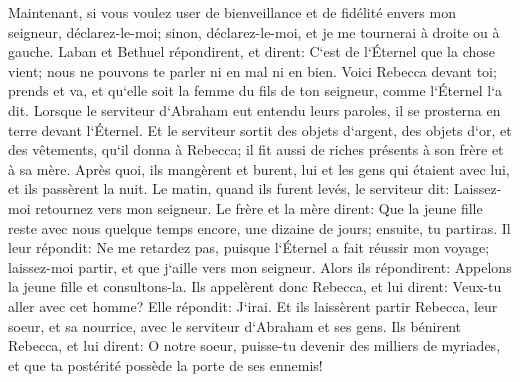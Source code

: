 \verse Maintenant, si vous voulez user de bienveillance et de fidélité envers mon seigneur, déclarez-le-moi; sinon, déclarez-le-moi, et je me tournerai à droite ou à gauche. 
\verse Laban et Bethuel répondirent, et dirent: C`est de l`Éternel que la chose vient; nous ne pouvons te parler ni en mal ni en bien. 
\verse Voici Rebecca devant toi; prends et va, et qu`elle soit la femme du fils de ton seigneur, comme l`Éternel l`a dit. 
\verse Lorsque le serviteur d`Abraham eut entendu leurs paroles, il se prosterna en terre devant l`Éternel. 
\verse Et le serviteur sortit des objets d`argent, des objets d`or, et des vêtements, qu`il donna à Rebecca; il fit aussi de riches présents à son frère et à sa mère. 
\verse Après quoi, ils mangèrent et burent, lui et les gens qui étaient avec lui, et ils passèrent la nuit. Le matin, quand ils furent levés, le serviteur dit: Laissez-moi retournez vers mon seigneur. 
\verse Le frère et la mère dirent: Que la jeune fille reste avec nous quelque temps encore, une dizaine de jours; ensuite, tu partiras. 
\verse Il leur répondit: Ne me retardez pas, puisque l`Éternel a fait réussir mon voyage; laissez-moi partir, et que j`aille vers mon seigneur. 
\verse Alors ils répondirent: Appelons la jeune fille et consultons-la. 
\verse Ils appelèrent donc Rebecca, et lui dirent: Veux-tu aller avec cet homme? Elle répondit: J`irai. 
\verse Et ils laissèrent partir Rebecca, leur soeur, et sa nourrice, avec le serviteur d`Abraham et ses gens. 
\verse Ils bénirent Rebecca, et lui dirent: O notre soeur, puisse-tu devenir des milliers de myriades, et que ta postérité possède la porte de ses ennemis! 

